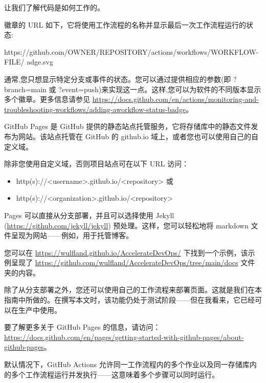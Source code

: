 让我们了解代码是如何工作的。


徽章的 URL 如下，它将使用工作流程的名称并显示最后一次工作流程运行的状态:

\begin{shell}
https://github.com/OWNER/REPOSITORY/actions/workflows/WORKFLOW-FILE/ adge.svg
\end{shell}

通常,您只想显示特定分支或事件的状态。您可以通过提供相应的参数(即 ?branch=main 或 ?event=push)来实现这一点。这样,您可以为软件的不同版本显示多个徽章。更多信息请参见 \url{ https://docs.github.com/en/actions/monitoring-and-troubleshooting-workflows/adding-aworkflow-status-badge}。


GitHub Pages 是 GitHub 提供的静态站点托管服务，它将存储库中的静态文件发布为网站。该站点托管在 GitHub 的 github.io 域上，或者您也可以使用自己的自定义域。

除非您使用自定义域，否则项目站点可在以下 URL 访问：

\begin{itemize}
\item 
http(s)://<username>.github.io/<repository> 或

\item 
http(s)://<organization>.github.io/<repository>
\end{itemize}

Pages 可以直接从分支部署，并且可以选择使用 Jekyll (\url{https://github.com/jekyll/jekyll}) 预处理。这样，您可以轻松地将 markdown 文件呈现为网站——例如，用于托管博客。

您可以在 \url{https://wulfland.github.io/AccelerateDevOps/} 下找到一个示例，该示例呈现了 \url{https://github.com/wulfland/AccelerateDevOps/tree/main/docs} 文件夹的内容。

除了从分支部署之外，您还可以使用自己的工作流程来部署页面。这就是我们在本指南中所做的。在撰写本文时，该功能仍处于测试阶段——但在我看来，它已经可以在生产中使用。

要了解更多关于 GitHub Pages 的信息，请访问：\url{https://docs.github.com/en/pages/getting-started-with-github-pages/about-github-pages}。


默认情况下，GitHub Actions 允许同一工作流程内的多个作业以及同一存储库内的多个工作流程运行并发执行——这意味着多个步骤可以同时运行。


